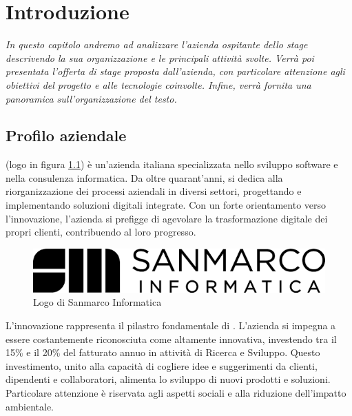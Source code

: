 \chapter{Introduzione}
\label{cap:introduzione}
%
%
%
%
%
%
%
\emph{In questo capitolo andremo ad analizzare l'azienda ospitante dello stage descrivendo la sua organizzazione e le principali attività svolte. Verrà poi presentata l'offerta di stage proposta dall'azienda, con particolare attenzione agli obiettivi del progetto e alle tecnologie coinvolte. Infine, verrà fornita una panoramica sull'organizzazione del testo.}

\section{Profilo aziendale}
\myCompany (logo in figura \ref{fig:logo_sanmarco})  è un'azienda italiana specializzata nello sviluppo software e nella consulenza informatica. Da oltre quarant'anni, \myCompany si dedica alla riorganizzazione dei processi aziendali in diversi settori, progettando e implementando soluzioni digitali integrate. Con un forte orientamento verso l'innovazione, l'azienda si prefigge di agevolare la trasformazione digitale dei propri clienti, contribuendo al loro progresso.

\begin{figure}[h!]
    \centering
    \includegraphics[width=0.6\columnwidth]{img/logo_sanmarco_informatica.png}
    \caption{Logo di Sanmarco Informatica}
    \label{fig:logo_sanmarco}
\end{figure}

L'innovazione rappresenta il pilastro fondamentale di \myCompany. L'azienda si impegna a essere costantemente riconosciuta come altamente innovativa, investendo tra il 15\% e il 20\% del fatturato annuo in attività di Ricerca e Sviluppo. Questo investimento, unito alla capacità di cogliere idee e suggerimenti da clienti, dipendenti e collaboratori, alimenta lo sviluppo di nuovi prodotti e soluzioni. Particolare attenzione è riservata agli aspetti sociali e alla riduzione dell'impatto ambientale.

